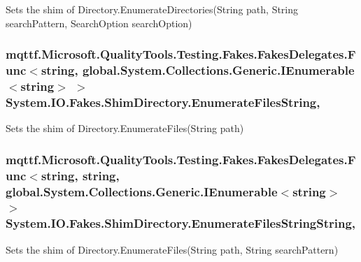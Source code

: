 Sets the shim of Directory.\-Enumerate\-Directories(\-String path, String search\-Pattern, Search\-Option search\-Option)

\hypertarget{class_system_1_1_i_o_1_1_fakes_1_1_shim_directory_af70281f42d50b2affece5f6ebeea4a8f}{
\subsubsection[{Enumerate\-Files\-String}]{\setlength{\rightskip}{0pt plus 5cm}mqttf.\-Microsoft.\-Quality\-Tools.\-Testing.\-Fakes.\-Fakes\-Delegates.\-Func$<$string, global.\-System.\-Collections.\-Generic.\-I\-Enumerable$<$string$>$ $>$ System.\-I\-O.\-Fakes.\-Shim\-Directory.\-Enumerate\-Files\-String\hspace{0.3cm}{\ttfamily [static]}, {\ttfamily [set]}}}\label{class_system_1_1_i_o_1_1_fakes_1_1_shim_directory_af70281f42d50b2affece5f6ebeea4a8f}


Sets the shim of Directory.\-Enumerate\-Files(\-String path)

\hypertarget{class_system_1_1_i_o_1_1_fakes_1_1_shim_directory_a8bc129632c38507d9de4dc683b9f7089}{
\subsubsection[{Enumerate\-Files\-String\-String}]{\setlength{\rightskip}{0pt plus 5cm}mqttf.\-Microsoft.\-Quality\-Tools.\-Testing.\-Fakes.\-Fakes\-Delegates.\-Func$<$string, string, global.\-System.\-Collections.\-Generic.\-I\-Enumerable$<$string$>$ $>$ System.\-I\-O.\-Fakes.\-Shim\-Directory.\-Enumerate\-Files\-String\-String\hspace{0.3cm}{\ttfamily [static]}, {\ttfamily [set]}}}\label{class_system_1_1_i_o_1_1_fakes_1_1_shim_directory_a8bc129632c38507d9de4dc683b9f7089}


Sets the shim of Directory.\-Enumerate\-Files(\-String path, String search\-Pattern)

